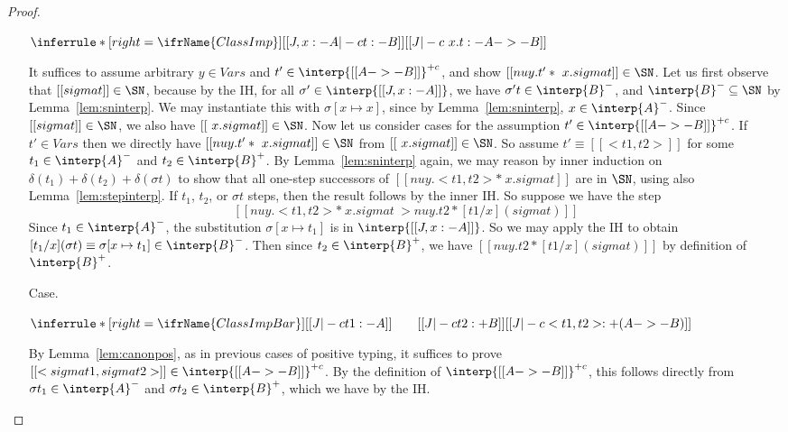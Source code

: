 \begin{proof}
\begin{itemize}
\vspace{-.2cm}
\begin{center}
\begin{math}
\inferrule* [right=\ifrName{ClassImp}] {[[J , x : - A |-c t : - B]]}{[[J |-c \ x . t : - A ->- B]]}
\end{math}
\end{center}
It suffices to assume arbitrary $y\in\textit{Vars}$ and
$t'\in\interp{[[A ->- B]]}^{+c}$, and show $[[ nu y . t' * \ x . sigma
t]]\in\SN$.  Let us first observe that $[[sigma t]]\in\SN$, because by
the IH, for all $\sigma'\in\interp{[[J , x : - A]]}$, we have $\sigma'
t\in\interp{B}^-$, and $\interp{B}^-\subseteq\SN$ by
Lemma~\ref{lem:sninterp}.  We may instantiate this with
$\sigma[x\mapsto x]$, since by Lemma~\ref{lem:sninterp},
$x\in\interp{A}^-$.  Since $[[sigma t]]\in\SN$, we also have $[[\ x
. sigma t]]\in\SN$.  Now let us consider cases for the assumption
$t'\in\interp{[[A ->- B]]}^{+c}$.  If $t'\in\textit{Vars}$ then we
directly have $[[ nu y . t' * \ x . sigma t]]\in\SN$ from $[[\ x
. sigma t]]\in\SN$.  So assume $t'\equiv[[< t1 , t2>]]$ for some
$t_1\in\interp{A}^-$ and $t_2\in\interp{B}^+$.  By
Lemma~\ref{lem:sninterp} again, we may reason by inner induction on
$\delta(t_1)+\delta(t_2)+\delta(\sigma t)$ to show that all one-step
successors of $[[ nu y . < t1 , t2 > * \ x . sigma t]]$ are in $\SN$,
using also Lemma~\ref{lem:stepinterp}.  If $t_1$, $t_2$, or $\sigma t$
steps, then the result follows by the inner IH.  So suppose we have
the step
\[
[[ nu y . < t1 , t2 > * \ x . sigma t ~>  nu y . t2 * [t1 / x ] (sigma t) ]]
\]
Since $t_1\in\interp{A}^-$, the substitution $\sigma[x\mapsto t_1]$ is
in $\interp{[[J , x : - A]]}$.  So we may apply the IH to obtain $[t_1
/ x ] (\sigma t) \equiv \sigma[x\mapsto t_1]\in\interp{B}^-$.  Then
since $t_2\in\interp{B}^+$, we have $[[nu y . t2 * [t1 / x ] (sigma t)
]]$ by definition of $\interp{B}^+$.

\item[Case.]\ 

\vspace{-.2cm}
\begin{center}
\begin{math}
\inferrule* [right=\ifrName{ClassImpBar}] {[[J |-c t1 : - A]]  \qquad [[ J |-c t2 : + B ]]}{[[ J |-c < t1 , t2 > : + (A ->- B) ]]}
\end{math}
\end{center}
By Lemma~\ref{lem:canonpos}, as in previous cases of positive typing,
it suffices to prove $[[< sigma t1 , sigma t2>]]\in\interp{[[A ->-
  B]]}^{+c}$.  By the definition of $\interp{[[A ->- B]]}^{+c}$, this
follows directly from $\sigma t_1\in\interp{A}^-$ and $\sigma
t_2\in\interp{B}^+$, which we have by the IH.


\end{itemize}
\end{proof}
